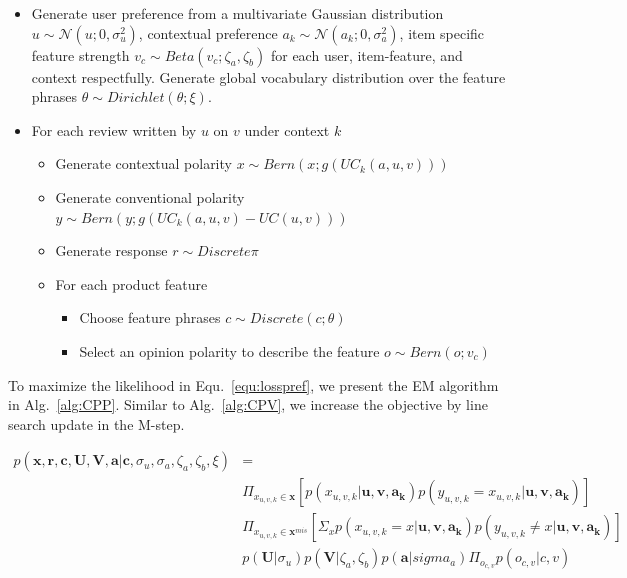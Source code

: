 \documentclass[sigconf]{acmart}
\newcommand{\feedback}{\mathbf{x}}
\newcommand{\response}{\mathbf{r}}
\begin{document}
\begin{itemize}
	\item Generate user preference from a multivariate Gaussian distribution $u\sim \mathcal{N}(u;0,\sigma_u^2)$, contextual preference $a_k\sim \mathcal{N}(a_k;0,\sigma_a^2)$, item specific feature strength $v_c \sim Beta(v_c;\zeta_a,\zeta_b)$ for each user, item-feature, and context respectfully. Generate global vocabulary distribution over the feature phrases $\theta\sim Dirichlet(\theta;\xi)$.
	\item For each review written by $u$ on $v$ under context $k$
	\begin{itemize}
	\item Generate contextual polarity $x\sim Bern(x;g(UC_k(a,u,v)))$
	\item Generate conventional polarity $y\sim Bern(y;g(UC_k(a,u,v)-UC(u,v)))$
	\item Generate response $r \sim Discrete{\pi}$
	\item For each product feature
	\begin{itemize}
	\item Choose feature phrases $c\sim Discrete(c;\theta)$
	\item Select an opinion polarity to describe the feature $o \sim Bern(o;v_c)$
	\end{itemize}
	\end{itemize}
\end{itemize}

To maximize the likelihood in Equ.~\ref{equ:losspref}, we present the EM algorithm in Alg.~\ref{alg:CPP}. Similar to Alg.~\ref{alg:CPV}, we increase the objective by line search update in the M-step.

\begin{eqnarray}\label{equ:losspref}
 p(\feedback,\response,\mathbf{c},\mathbf{U},\mathbf{V},\mathbf{a}|\mathbf{c},\sigma_u,\sigma_a,\zeta_a,\zeta_b,\xi) & =  \\\nonumber
& \Pi_{x_{u,v,k}\in \feedback}[p(x_{u,v,k}|\mathbf{u,v,a_k})p(y_{u,v,k}=x_{u,v,k}|\mathbf{u,v,a_k})] \\\nonumber
&\Pi_{x_{u,v,k}\in \feedback^{mis}}[\Sigma_x p(x_{u,v,k}=x|\mathbf{u,v,a_k})p(y_{u,v,k}\neq x|\mathbf{u,v,a_k})] \\\nonumber
&p(\mathbf{U}|\sigma_u)p(\mathbf{V}|\zeta_a,\zeta_b)p(\mathbf{a}|sigma_a)\Pi_{o_{c,v}} p(o_{c,v}|c,v)
\end{eqnarray}
\end{document}
